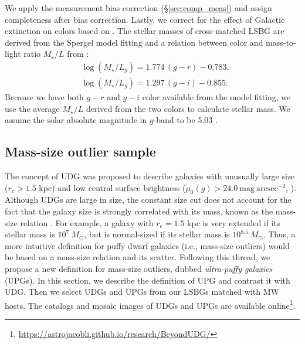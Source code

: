 \documentclass[twocolumn,astrosymb,twocolappendix]{aastex631}
\newcommand{\sbunit}{\mathrm{mag\ arcsec}^{-2}}
\newcommand{\sbcen}{\mu_{0}(g)}
\begin{document}
\begin{CJK*}{UTF8}{gbsn}
We apply the measurement bias correction (\S \ref{sec:comp_meas}) and assign completeness after bias correction. Lastly, we correct for the effect of Galactic extinction on colors based on \citet{SFD1998,Schlafly2011}. The stellar masses of cross-matched LSBG are derived from the Spergel model fitting and a relation between color and mass-to-light ratio $M_{\star}/L$ from \citet{Into2013}:
\begin{align*}
&\log \left(M_{\star} / L_{g}\right)=1.774\,(g-r)-0.783, \\
&\log \left(M_{\star} / L_{g}\right)=1.297\,(g-i)-0.855.
\end{align*}
Because we have both $g-r$ and $g-i$ color available from the model fitting, we use the average $M_{\star}/L$ derived from the two colors to calculate stellar mass. We assume the solar absolute magnitude in $g$-band to be 5.03 \citep{Willmer2018}. 



\subsection{Mass-size outlier sample}\label{sec:sample}
The concept of UDG was proposed to describe galaxies with unusually large size ($r_e>1.5$ kpc) and low central surface brightness ($\sbcen > 24.0\ \sbunit$, \citealt{vanDokkum2015}). Although UDGs are large in size, the constant size cut does not account for the fact that the galaxy size is strongly correlated with its mass, known as the mass-size relation \citep[e.g.,][]{Graham2003,Trujillo2007,vanDokkum2013,Cappellari2013,Lange2015}. For example, a galaxy with $r_e = 1.5$ kpc is very extended if its stellar mass is $10^7\ M_\odot$, but is normal-sized if its stellar mass is $10^{8.5}\ M_\odot$.
Thus, a more intuitive definition for puffy dwarf galaxies (i.e., mass-size outliers) would be based on a mass-size relation and its scatter. Following this thread, we propose a new definition for mass-size outliers, dubbed \textit{ultra-puffy galaxies} (UPGs). In this section, we describe the definition of UPG and contrast it with UDG. Then we select UDGs and UPGs from our LSBGs matched with MW hosts. The catalogs and mosaic images of UDGs and UPGs are available online\footnote{\url{https://astrojacobli.github.io/research/BeyondUDG/}}.


\end{CJK*}
\end{document}

